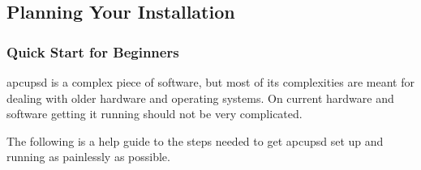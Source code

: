 \label{index-User_0027s-Guide-4}

\label{Planning-Your-Installation}

\subsection*{Planning Your Installation}

\label{index-Planning-Installation-5}
\label{index-Installation_002c-Planning-6}

\label{Quick-Start-for-Beginners}

\subsubsection*{Quick Start for Beginners}

\label{index-Quick-Start-7}
apcupsd is a complex piece of software, but most of its complexities are meant
for dealing with older hardware and operating systems.  On current hardware
and software getting it running should not be very complicated.  

The following is a help guide to the steps needed to get apcupsd set up and
running as painlessly as possible.  

